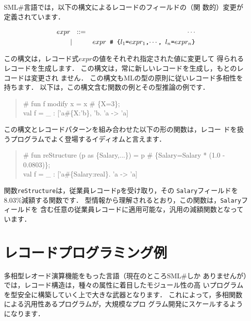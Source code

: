 \documentclass{jbook}
\newcommand{\smlsharp}{SML\#}
\begin{document}
	\smlsharp{}言語では，以下の構文によるレコードのフィールドの（関
数的）変更が定義されています．
\begin{tt}
\begin{eqnarray*}
expr &\mbox{\ \ }::=& \cdots \\
     &|& \mbox{\tt $expr$ {\#} \{$l_1$=$expr_1$,$\cdots$, $l_n$=$expr_n$\}}
\end{eqnarray*}
\end{tt}
	この構文は，レコード式$expr$の値をそれぞれ指定された値に変更して
得られるレコードを生成します．
	この構文は，常に新しいレコードを生成し，もとのレコードは変更され
ません．
	この構文もMLの型の原則に従いレコード多相性を持ちます．
	以下は，この構文含む関数の例とその型推論の例です．
\begin{tt}\begin{quote}
\# fun f modify x = x \# \{X=3\};\\
val f = \_ : ['a\#\{X:'b\}, 'b.  'a -> 'a]
\end{quote}\end{tt}
	この構文とレコードパターンを組み合わせた以下の形の関数は，レコー
ドを扱うプログラムでよく登場するイディオムと言えます．
\begin{tt}\begin{quote}
\# fun reStructure (p as \{Salary,...\}) = p \# \{Salary=Salary * (1.0 - 0.0803)\};\\
val f = \_ : ['a\#\{Salary:real\}.  'a -> 'a]
\end{quote}\end{tt}
	関数{\tt reStructure}は，従業員レコード{\tt p}を受け取り，その
{\tt Salary}フィールドを8.03\%減額する関数です．
	型情報から理解されるとおり，この関数は，{\tt Salary}フィールドを
含む任意の従業員レコードに適用可能な，汎用の減額関数となっています．

\section{レコードプログラミング例}
\label{sec:extensionRecordProgramming}

	多相型レオード演算機能をもった言語（現在のところ\smlsharp{}しか
ありませんが）では，レコード構造は，種々の属性に着目したモジュール性の高
いプログラムを型安全に構築していく上で大きな武器となります．
	これによって，多相関数による汎用性あるプログラムが，大規模なプロ
グラム開発にスケールするようになります．
\end{document}
